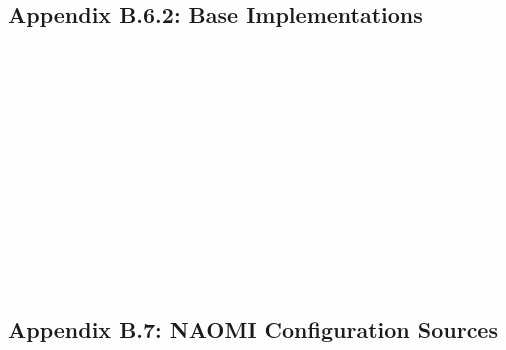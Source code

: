 \documentclass{article}[11pt]
\begin{document}
\subsection{Appendix B.6.2: Base Implementations}
\inputminted[frame=single,label=MatrixImpl.groovy]{python}{../naomi/src/main/groovy/org/radigan/system/utilities/MatrixImpl.groovy}
\inputminted[frame=single,label=ClojureTool.groovy]{python}{../naomi/src/main/groovy/org/radigan/system/interpreter/ClojureTool.groovy.DISABLED}
\inputminted[frame=single,label=ScriptTool.groovy]{python}{../naomi/src/main/groovy/org/radigan/system/interpreter/ScriptTool.groovy}
\inputminted[frame=single,label=Configuration.groovy]{python}{../naomi/src/main/groovy/org/radigan/system/configuration/Configuration.groovy}
\inputminted[frame=single,label=AbstractTool.groovy]{python}{../naomi/src/main/groovy/org/radigan/system/tools/AbstractTool.groovy}
\inputminted[frame=single,label=Command.groovy]{python}{../naomi/src/main/groovy/org/radigan/system/tools/Command.groovy}
\inputminted[frame=single,label=Command2.groovy]{python}{../naomi/src/main/groovy/org/radigan/system/tools/Command2.groovy}
\inputminted[frame=single,label=Encoder.groovy]{python}{../naomi/src/main/groovy/org/radigan/system/utilities/Encoder.groovy}
\inputminted[frame=single,label=Entropy.groovy]{python}{../naomi/src/main/groovy/org/radigan/system/utilities/Entropy.groovy}
\inputminted[frame=single,label=FileCollection.groovy]{python}{../naomi/src/main/groovy/org/radigan/system/utilities/FileCollection.groovy}
\inputminted[frame=single,label=Md5.groovy]{python}{../naomi/src/main/groovy/org/radigan/system/utilities/Md5.groovy}
\inputminted[frame=single,label=Record.groovy]{python}{../naomi/src/main/groovy/org/radigan/system/utilities/Record.groovy}
\inputminted[frame=single,label=Recordset.groovy]{python}{../naomi/src/main/groovy/org/radigan/system/utilities/RecordSet.groovy}
\inputminted[frame=single,label=ResourceManager.groovy]{python}{../naomi/src/main/groovy/org/radigan/system/utilities/ResourceManager.groovy}
\inputminted[frame=single,label=Rot13.groovy]{python}{../naomi/src/main/groovy/org/radigan/system/utilities/Rot13.groovy}
\inputminted[frame=single,label=Shell.groovy]{python}{../naomi/src/main/groovy/org/radigan/system/utilities/Shell.groovy}
\inputminted[frame=single,label=XmlUtilities.groovy]{python}{../naomi/src/main/groovy/org/radigan/system/utilities/XmlUtilities.groovy}
\inputminted[frame=single,label=Xsp.groovy]{python}{../naomi/src/main/groovy/org/radigan/system/utilities/Xsp.groovy}
\subsection{Appendix B.7: NAOMI Configuration Sources}
\inputminted[frame=single,label=datatypes.xml]{xml}{../dist/config/datatypes.xml}
\inputminted[frame=single,label=logging.properties]{bash}{../dist/config/logging.properties}
\inputminted[frame=single,label=naomi.conf]{python}{../dist/config/naomi.conf}
\end{document}
